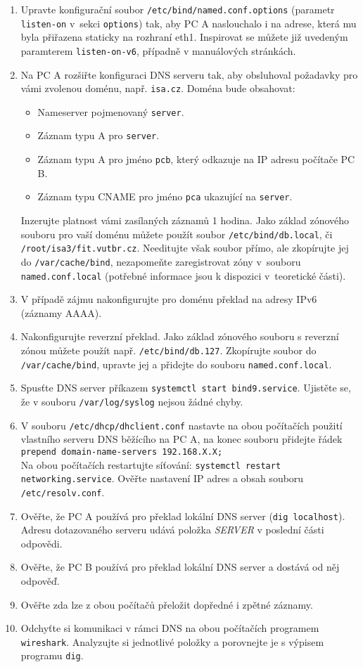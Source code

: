 \begin{enumerate}
  \item Upravte konfigurační soubor {\tt /etc/bind/named.conf.options} (parametr
    {\tt listen-on} v~sekci {\tt options}) tak, aby
    PC A naslouchalo i na adrese, která mu byla přiřazena staticky na rozhraní eth1.
    Inspirovat se můžete již uvedeným paramterem {\tt listen-on-v6}, případně v
    manuálových stránkách.
  \item Na PC A rozšiřte konfiguraci DNS serveru tak, aby obsluhoval požadavky pro vámi
    zvolenou doménu, např. {\tt isa.cz}. Doména bude obsahovat:
    \begin{itemize}
      \item Nameserver pojmenovaný {\tt server}.
      \item Záznam typu A pro {\tt server}.
      \item Záznam typu A pro jméno {\tt pcb}, který odkazuje na IP adresu
        počítače PC B.
      \item Záznam typu CNAME pro jméno {\tt pca} ukazující na {\tt server}.
    \end{itemize}
    Inzerujte platnost vámi zasílaných záznamů 1 hodina.
    Jako základ zónového souboru pro vaší
    doménu můžete použít soubor {\tt /etc/bind/db.local}, či {\tt
    /root/isa3/fit.vutbr.cz}.
    Needitujte však soubor přímo, ale zkopírujte jej do {\tt /var/cache/bind},
    nezapomeňte zaregistrovat zóny
    v~souboru {\tt named.conf.local} (potřebné informace jsou k dispozici
    v~teoretické části).
  \item V případě zájmu nakonfigurujte pro doménu překlad na adresy IPv6
    (záznamy AAAA).
  \item Nakonfigurujte reverzní překlad. Jako základ
    zónového souboru s reverzní zónou můžete použít např. {\tt /etc/bind/db.127}.
    Zkopírujte soubor do {\tt /var/cache/bind}, upravte jej a přidejte do
    souboru {\tt named.conf.local}.
  \item Spusťte DNS server příkazem {\tt systemctl start bind9.service}.
    Ujistěte se, že v souboru {\tt /var/log/syslog} nejsou žádné chyby.
  \item V souboru {\tt /etc/dhcp/dhclient.conf} nastavte na obou počítačích použití vlastního
    serveru DNS běžícího na PC A, na konec souboru přidejte řádek \\
    {\tt prepend domain-name-servers
    192.168.X.X;} \\ Na obou počítačích restartujte síťování: {\tt systemctl restart networking.service}.
    Ověřte nastavení IP adres a obsah souboru {\tt /etc/resolv.conf}.
  \item Ověřte, že PC A používá pro překlad lokální DNS server ({\tt dig
    localhost}). Adresu dotazovaného serveru udává položka {\em SERVER} v
    poslední části odpovědi.
  \item Ověřte, že PC B používá pro překlad lokální DNS server a dostává od něj odpověď.
  \item Ověřte zda lze z obou počítačů přeložit dopředné i zpětné záznamy.
  \item Odchyťte si komunikaci v rámci DNS na obou počítačích programem
    {\tt wireshark}. Analyzujte si jednotlivé položky a porovnejte je s výpisem
    programu {\tt dig}.


\end{enumerate}
